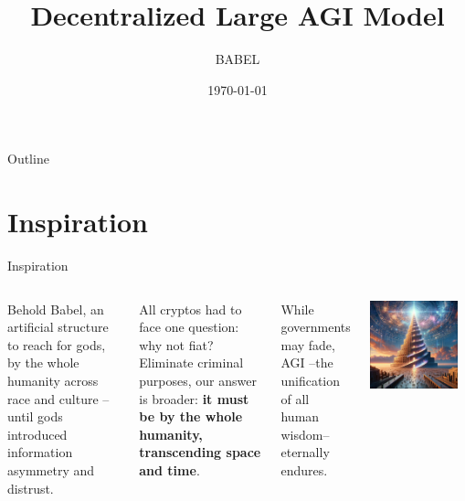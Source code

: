 \documentclass{beamer}
\title{Decentralized Large AGI Model}
\author{BABEL}
\institute{P.I.V.O.T. DAO}
\date{\today}
\begin{document}
\begin{frame}
\titlepage
\end{frame}

\begin{frame}{Outline}
\tableofcontents
\end{frame}

\section{Inspiration}
\begin{frame}{Inspiration}

\begin{columns}
Behold Babel, an artificial structure to reach for gods,  by the whole humanity across race and culture -- until gods introduced information asymmetry and distrust. 

All cryptos had to face one question: why not fiat? Eliminate criminal purposes, our answer is broader: \textbf{it must be by the whole humanity, transcending space and time}. 

While governments may fade, AGI --the unification of all human wisdom-- eternally endures.
\begin{center}
\includegraphics[width=0.9\textwidth]{images/babel.png}
\end{center}
\end{columns}

\end{frame}
\end{document}

